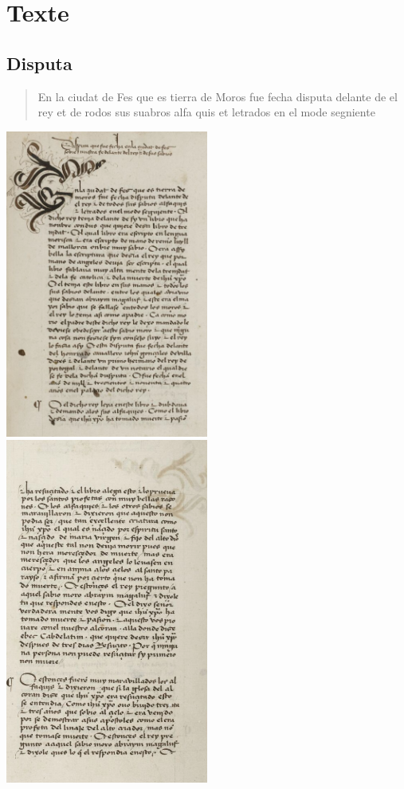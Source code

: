 \section{Texte}

\subsection{Disputa }

\begin{quote}
    En la ciudat de Fes que es tierra de Moros fue fecha disputa delante de el rey et de rodos sus suabros alfa quis et letrados en el mode segniente  
\end{quote}
\includegraphics[width=0.5\textwidth]{HistoireIslamMediterranee/Images/DisputaFez1.png}
\includegraphics[width=0.5\textwidth]{HistoireIslamMediterranee/Images/DisputaFez2.png}
